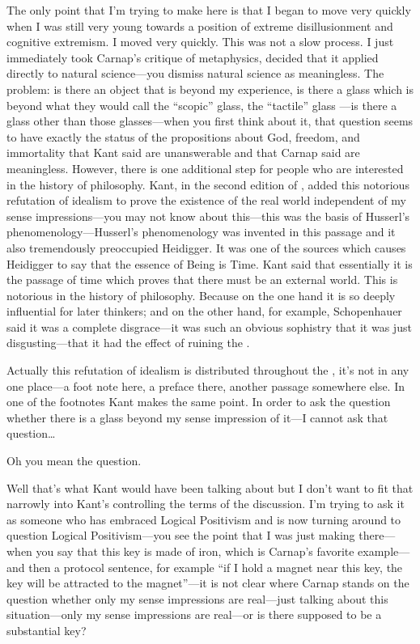 The only point that I'm trying to make here is that I began to move 
very quickly when I was still very young towards a position of extreme 
disillusionment and cognitive extremism. I moved very quickly. This 
was not a slow process. I just immediately took Carnap's critique of 
metaphysics, decided that it applied directly to natural science---you 
dismiss natural science as meaningless. The problem: is there an object 
that is beyond my experience, is there a glass which is beyond what they 
would call the \enquote{scopic} glass, the \enquote{tactile} glass ---is there a glass other than 
those glasses---when you first think about it, that question seems to 
have exactly the status of the propositions about God, freedom, and 
immortality that Kant said are unanswerable and that Carnap said are 
meaningless. However, there is one additional step for people who are 
interested in the history of philosophy. Kant, in the second edition of 
, added this notorious refutation of idealism to 
prove the existence of the real world independent of my sense 
impressions---you may not know about this---this was the basis of 
Husserl's phenomenology---Husserl's phenomenology was invented in 
this passage and it also tremendously preoccupied Heidigger. It was 
one of the sources which causes Heidigger to say that the essence of 
Being is Time. Kant said that essentially it is the passage of time which 
proves that there must be an external world. This is notorious in the 
history of philosophy. Because on the one hand it is so deeply 
influential for later thinkers; and on the other hand, for example, 
Schopenhauer said it was a complete disgrace---it was such an obvious sophistry 
that it was just disgusting---that it had the effect of ruining the 
. 

Actually this refutation of idealism is distributed throughout the 
, it's not in any one place---a foot note here, 
a preface there, another passage somewhere else. In one of the footnotes 
Kant makes the same point. In order to ask the question whether 
there is a glass beyond my sense impression of it---I cannot ask that 
question\ldots

 Oh you mean the  question. 

 Well that's what Kant would have been talking about but I 
don't want to fit that narrowly into Kant's controlling the terms of the 
discussion. I'm trying to ask it as someone who has embraced 
Logical Positivism and is now turning around to question Logical 
Positivism---you see the point that I was just making there---when 
you say that this key is made of iron, which is Carnap's favorite 
example---and then a protocol sentence, for example 
\enquote{if I hold a magnet near this key, the key will be attracted to the magnet}---it 
is not clear where Carnap stands on 
the question whether only my sense impressions are real---just talking 
about this situation---only my sense impressions are real---or is there 
supposed to be a substantial key? 

